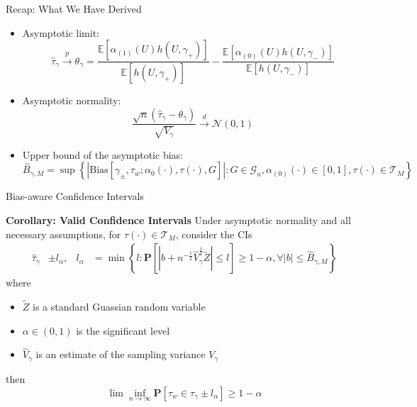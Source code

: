 \begin{frame}{Recap: What We Have Derived}
    \begin{itemize}
        \item<2-> Asymptotic limit: 
        $$
         \hat{\tau}_{\gamma}\xrightarrow{p}\theta_{\gamma}=\frac{\mathbb{E}\left[\alpha_{\left(1\right)}\left(U\right)h\left(U,\gamma_{+}\right)\right]}{\mathbb{E}\left[h\left(U,\gamma_{+}\right)\right]}-\frac{\mathbb{E}\left[\alpha_{\left(0\right)}\left(U\right)h\left(U,\gamma_{-}\right)\right]}{\mathbb{E}\left[h\left(U,\gamma_{-}\right)\right]}
        $$
        \item<3-> Asymptotic normality:
        $$
        \frac{\sqrt{n}\left(\hat{\tau}_{\gamma}-\theta_{\gamma}\right)}{\sqrt{V_{\gamma}}}\xrightarrow{d}\mathcal{N}\left(0,1\right)
        $$
        \item<4-> Upper bound of the asymptotic bias:  
        $$
        \hat{B}_{\gamma,M}=\sup\left\{ \left|\mathrm{Bias}\left[\gamma_{\pm},\tau_{w};\alpha_{0}\left(\cdot\right),\tau\left(\cdot\right),G\right]\right|:G\in\mathcal{G}_{n},\alpha_{\left(0\right)}\left(\cdot\right)\in\left[0,1\right],\tau\left(\cdot\right)\in\mathcal{T}_{M}\right\} 
        $$
    \end{itemize}
    
 \end{frame}

 \begin{frame}{Bias-aware Confidence Intervals}

    \begin{block}{\textbf{Corollary: Valid Confidence Intervals}}
        \small
        Under asymptotic normality and all necessary assumptions, for $\tau(\cdot)\in \mathcal{T}_M$, consider the CIs
        \begin{align*}
            \hat{\tau}_{\gamma}&\pm l_{\alpha}, &l_{\alpha}&=\min\left\{ l:\mathbf{P}\left[\left|b+n^{-\frac{1}{2}}\hat{V}_{\gamma}^{\frac{1}{2}}\tilde{Z}\right|\leq l\right]\geq1-\alpha,\forall\left|b\right|\leq\hat{B}_{\gamma,M}\right\} 
        \end{align*}
        where
        \begin{itemize}
            \item $\tilde{Z}$ is a standard Guassian random variable
            \item $\alpha\in\left(0,1\right)$ is the significant level
            \item $\hat{V}_{\gamma}$ is an estimate of the sampling variance $V_{\gamma}$
        \end{itemize}
        then
        $$
        \lim\inf_{n\rightarrow\infty}\mathbf{P}\left[\tau_{w}\in\hat{\tau}_{\gamma}\pm l_{\alpha}\right]\geq1-\alpha
        $$
        
    \end{block}
    
 \end{frame}

